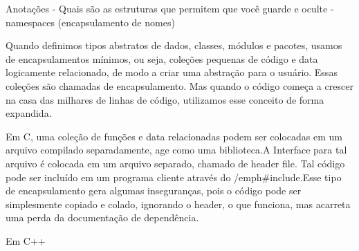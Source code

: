 ﻿Anotações
- Quais são as estruturas que permitem que você guarde e oculte
- namespaces (encapsulamento de nomes)

Quando definimos tipos abstratos de dados, classes, módulos
e pacotes, usamos de encapsulamentos  mínimos, ou seja, coleções pequenas
de código e data logicamente relacionado, de modo a criar uma abstração 
para o usuário. Essas coleções são chamadas de encapsulamento.
Mas quando o código começa a crescer na casa das milhares de linhas de
código, utilizamos esse conceito de forma expandida. 

Em C, uma coleção de funções e data relacionadas podem ser colocadas em 
um arquivo compilado separadamente, age como uma biblioteca.A Interface
 para tal arquivo é colocada em um arquivo separado, chamado de header 
file. Tal código pode ser incluído em um programa cliente através do 
/emph{#include}.Esse tipo de encapsulamento gera algumas inseguranças,
pois o código pode ser simplesmente copiado e colado, ignorando o header,
o que funciona, mas acarreta uma perda da documentação de dependência. 

Em C++ 
